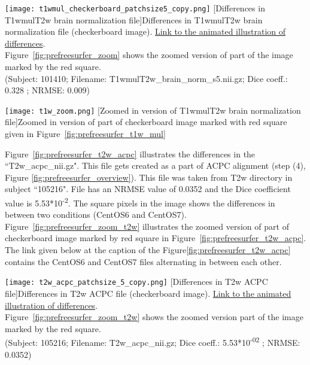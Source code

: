\begin{center}
\texttt{[image: t1wmul\_checkerboard\_patchsize5\_copy.png]}
[Differences in T1wmulT2w brain normalization file]{Differences in T1wmulT2w brain normalization file (checkerboard image). \href{https://drive.google.com/file/d/1eHyrs180QbF4a-kSSz5mFkdirTgdXhc_/view?usp=sharing}{Link to the animated illustration of differences}.\\Figure~\ref{fig:prefreesurfer_zoom} shows the zoomed version of part of the image marked by the red square.\\(Subject: 101410; Filename: T1wmulT2w\_brain\_norm\_s5.nii.gz; Dice coeff.: 0.328 ; NRMSE: 0.009)}
\label{fig:prefreesurfer_t1w_mul}
\end{center}

\begin{center}
\texttt{[image: t1w\_zoom.png]}
[Zoomed in version of T1wmulT2w brain normalization file]{{Zoomed in version of part of checkerboard image marked with red square given in Figure~\ref{fig:prefreesurfer_t1w_mul}}}
\label{fig:prefreesurfer_zoom}
\end{center}

Figure~\ref{fig:prefreesurfer_t2w_acpc} illustrates the differences in the ``T2w\_acpc\_nii.gz". This file gets created as a part of ACPC alignment (step (4), Figure \ref{fig:prefreesurfer_overview}). This file was taken from T2w directory in subject ``105216". File has an NRMSE value of 0.0352 and the Dice coefficient value is 5.53*10\textsuperscript{-2}. The square pixels in the image shows the differences in between two conditions (CentOS6 and CentOS7). Figure~\ref{fig:prefreesurfer_zoom_t2w} illustrates the zoomed version of part of checkerboard image marked by red square in Figure~\ref{fig:prefreesurfer_t2w_acpc}. The link given below at the caption of the Figure\ref{fig:prefreesurfer_t2w_acpc} contains the CentOS6 and CentOS7 files alternating in between each other.

\begin{center}
\texttt{[image: t2w\_acpc\_patchsize\_5\_copy.png]}
[Differences in T2w ACPC file]{Differences in T2w ACPC file (checkerboard image). \href{https://drive.google.com/file/d/1NrNl7POyCS_SZm3an00wOLUnkmLJ_ngo/view?usp=sharing}{Link to the animated illustration of differences}.\\Figure~\ref{fig:prefreesurfer_zoom_t2w} shows the zoomed version part of the image marked by the red square. \\(Subject: 105216; Filename: T2w\_acpc\_nii.gz; Dice coeff.: 5.53*10\textsuperscript{-02} ; NRMSE: 0.0352)}
\label{fig:prefreesurfer_t2w_acpc}
\end{center}

